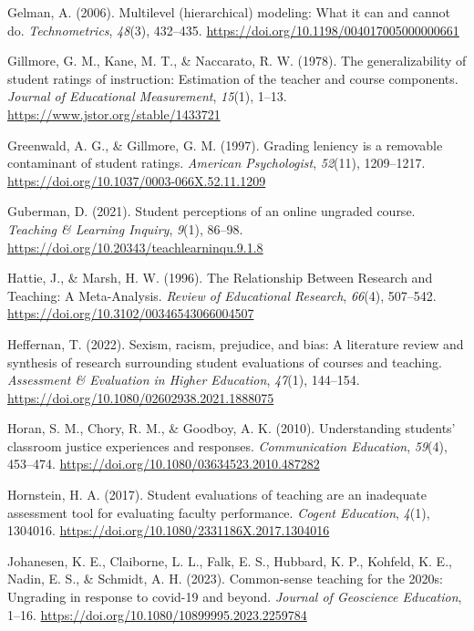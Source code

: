 \documentclass[
  man]{apa7}
\newlength{\cslhangindent}
\newenvironment{CSLReferences}[2] %
 {\begin{list}{}{%
  \setlength{\itemindent}{0pt}
  \setlength{\leftmargin}{0pt}
  \setlength{\parsep}{0pt}
  \ifodd #1
   \setlength{\leftmargin}{\cslhangindent}
   \setlength{\itemindent}{-1\cslhangindent}
  \fi
  \setlength{\itemsep}{#2\baselineskip}}}
 {\end{list}}
\begin{document}
\begin{CSLReferences}{1}{0}
Gelman, A. (2006). Multilevel (hierarchical) modeling: What it can and cannot do. \emph{Technometrics}, \emph{48}(3), 432--435. \url{https://doi.org/10.1198/004017005000000661}

Gillmore, G. M., Kane, M. T., \& Naccarato, R. W. (1978). The generalizability of student ratings of instruction: Estimation of the teacher and course components. \emph{Journal of Educational Measurement}, \emph{15}(1), 1--13. \url{https://www.jstor.org/stable/1433721}

Greenwald, A. G., \& Gillmore, G. M. (1997). Grading leniency is a removable contaminant of student ratings. \emph{American Psychologist}, \emph{52}(11), 1209--1217. \url{https://doi.org/10.1037/0003-066X.52.11.1209}

Guberman, D. (2021). Student perceptions of an online ungraded course. \emph{Teaching \& Learning Inquiry}, \emph{9}(1), 86--98. \url{https://doi.org/10.20343/teachlearninqu.9.1.8}

Hattie, J., \& Marsh, H. W. (1996). The Relationship Between Research and Teaching: A Meta-Analysis. \emph{Review of Educational Research}, \emph{66}(4), 507--542. \url{https://doi.org/10.3102/00346543066004507}

Heffernan, T. (2022). Sexism, racism, prejudice, and bias: A literature review and synthesis of research surrounding student evaluations of courses and teaching. \emph{Assessment \& Evaluation in Higher Education}, \emph{47}(1), 144--154. \url{https://doi.org/10.1080/02602938.2021.1888075}

Horan, S. M., Chory, R. M., \& Goodboy, A. K. (2010). Understanding students' classroom justice experiences and responses. \emph{Communication Education}, \emph{59}(4), 453--474. \url{https://doi.org/10.1080/03634523.2010.487282}

Hornstein, H. A. (2017). Student evaluations of teaching are an inadequate assessment tool for evaluating faculty performance. \emph{Cogent Education}, \emph{4}(1), 1304016. \url{https://doi.org/10.1080/2331186X.2017.1304016}

Johanesen, K. E., Claiborne, L. L., Falk, E. S., Hubbard, K. P., Kohfeld, K. E., Nadin, E. S., \& Schmidt, A. H. (2023). Common-sense teaching for the 2020s: Ungrading in response to covid-19 and beyond. \emph{Journal of Geoscience Education}, 1--16. \url{https://doi.org/10.1080/10899995.2023.2259784}


\end{CSLReferences}
\end{document}

